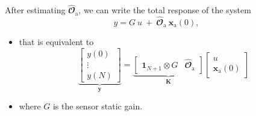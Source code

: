 \documentclass[presentation]{beamer}
\begin{document}
\begin{frame}[label={slide:preliminaries5}]{After estimating $\widehat{\mathbfcal{O}}_\text{a}$, we can write \linebreak the total response of the system}
\begin{equation*}  {y} = G \ u \ + \ \widehat{\mathbfcal{O}}_\text{a} \ \mathbf{x}_\text{a}(0) , \end{equation*}
\begin{itemize}
\item that is equivalent to
\begin{equation*}  \underbrace{ \begin{bmatrix} y(0) \\ \vdots \\ y(N) \end{bmatrix}}_{\mathbf{y}} = \underbrace{ \begin{bmatrix} \mathbf{1}_{N+1} \otimes G & \widehat{\mathbfcal{O}}_\text{a} \end{bmatrix}}_{\mathbf{K}} \begin{bmatrix} u \\ \mathbf{x}_\text{a}(0) \end{bmatrix} \end{equation*}
\item where $G$ is the sensor static gain.
\end{itemize}
\end{frame}
\end{document}
